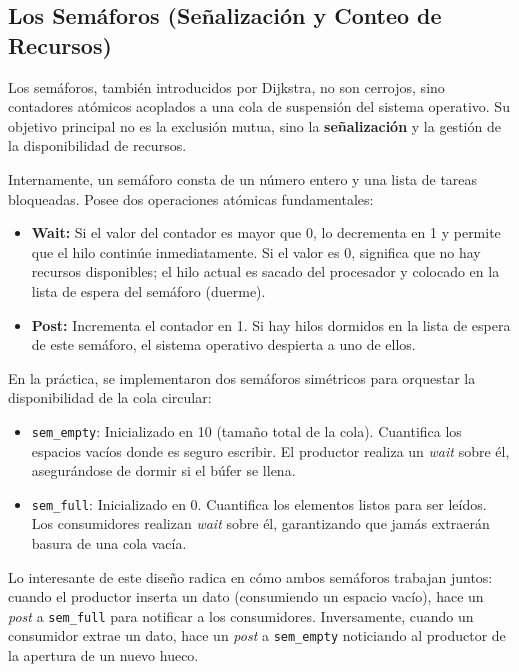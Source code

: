 \documentclass[runningheads]{llncs}
\begin{document}
\subsection{Los Semáforos (Señalización y Conteo de Recursos)}
Los semáforos, también introducidos por Dijkstra, no son cerrojos, sino contadores atómicos acoplados a una cola de suspensión del sistema operativo. Su objetivo principal no es la exclusión mutua, sino la \textbf{señalización} y la gestión de la disponibilidad de recursos. 

Internamente, un semáforo consta de un número entero y una lista de tareas bloqueadas. Posee dos operaciones atómicas fundamentales:
\begin{itemize}
    \item \textbf{Wait:} Si el valor del contador es mayor que 0, lo decrementa en 1 y permite que el hilo continúe inmediatamente. Si el valor es 0, significa que no hay recursos disponibles; el hilo actual es sacado del procesador y colocado en la lista de espera del semáforo (duerme).
    \item \textbf{Post:} Incrementa el contador en 1. Si hay hilos dormidos en la lista de espera de este semáforo, el sistema operativo despierta a uno de ellos.
\end{itemize}

En la práctica, se implementaron dos semáforos simétricos para orquestar la disponibilidad de la cola circular:
\begin{itemize}
    \item \texttt{sem\_empty}: Inicializado en 10 (tamaño total de la cola). Cuantifica los espacios vacíos donde es seguro escribir. El productor realiza un \textit{wait} sobre él, asegurándose de dormir si el búfer se llena.
    \item \texttt{sem\_full}: Inicializado en 0. Cuantifica los elementos listos para ser leídos. Los consumidores realizan \textit{wait} sobre él, garantizando que jamás extraerán basura de una cola vacía.
\end{itemize}

Lo interesante de este diseño radica en cómo ambos semáforos trabajan juntos: cuando el productor inserta un dato (consumiendo un espacio vacío), hace un \textit{post} a \texttt{sem\_full} para notificar a los consumidores. Inversamente, cuando un consumidor extrae un dato, hace un \textit{post} a \texttt{sem\_empty} noticiando al productor de la apertura de un nuevo hueco. 
\end{document}
